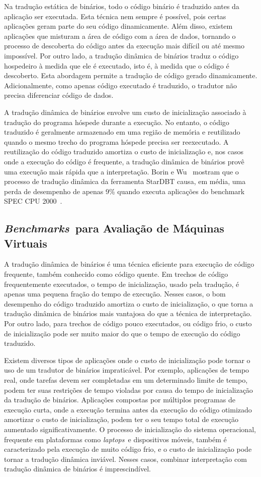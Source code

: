 \documentclass[a4paper,12pt]{article}
\newcommand{\Benchmarks}{\emph{Benchmarks}}
\newcommand{\laptops}{\emph{laptops}}
\begin{document}
Na tradução estática de binários, todo o código binário é traduzido antes da
aplicação ser executada. Esta técnica nem sempre é possível, pois certas
aplicações geram parte do seu código dinamicamente. Além disso, existem
aplicações que misturam a área de código com a área de dados, tornando o
processo de descoberta do código antes da execução mais difícil ou até mesmo
impossível. Por outro lado, a tradução dinâmica de binários traduz o código
hospedeiro à medida que ele é executado, isto é, à medida que o código é
descoberto. Esta abordagem permite a tradução de código gerado
dinamicamente. Adicionalmente, como apenas código executado é traduzido, o
tradutor não precisa diferenciar código de dados.

A tradução dinâmica de binários envolve um custo de inicialização associado à
tradução do programa hóspede durante a execução. No entanto, o código traduzido
é geralmente armazenado em uma região de memória e reutilizado quando o mesmo
trecho do programa hóspede precisa ser reexecutado. A reutilização do código
traduzido amortiza o custo de inicialização e, nos casos onde a execução do
código é frequente, a tradução dinâmica de binários provê uma execução mais
rápida que a interpretação. Borin e Wu~\cite{borin1} mostram que o processo de
tradução dinâmica da ferramenta StarDBT causa, em média, uma perda de desempenho
de apenas 9\% quando executa aplicações do benchmark SPEC CPU 2000~\cite{Hen00}.

\subsection{\Benchmarks\ para Avaliação de Máquinas Virtuais}
\label{subsec:av}
A tradução dinâmica de binários é uma técnica eficiente para execução de código
frequente, também conhecido como código quente. Em trechos de código
frequentemente executados, o tempo de inicialização, usado pela tradução, é
apenas uma pequena fração do tempo de execução. Nesses casos, o bom desempenho
do código traduzido amortiza o custo de inicialização, o que torna a tradução
dinâmica de binários mais vantajosa do que a técnica de interpretação. Por outro
lado, para trechos de código pouco executados, ou código frio, o custo de
inicialização pode ser muito maior do que o tempo de execução do código
traduzido.

Existem diversos tipos de aplicações onde o custo de inicialização pode tornar o
uso de um tradutor de binários impraticável. Por exemplo, aplicações de tempo
real, onde tarefas devem ser completadas em um determinado limite de tempo,
podem ter suas restrições de tempo violadas por causa do tempo de inicialização
da tradução de binários. Aplicações compostas por múltiplos programas de
execução curta, onde a execução termina antes da execução do código otimizado
amortizar o custo de inicialização, podem ter o seu tempo total de execução
aumentado significativamente. O processo de inicialização do sistema
operacional, frequente em plataformas como \laptops\ e dispositivos móveis,
também é caracterizado pela execução de muito código frio, e o custo de
inicialização pode tornar a tradução dinâmica inviável. Nesses casos, combinar
interpretação com tradução dinâmica de binários é imprescindível.
\end{document}
